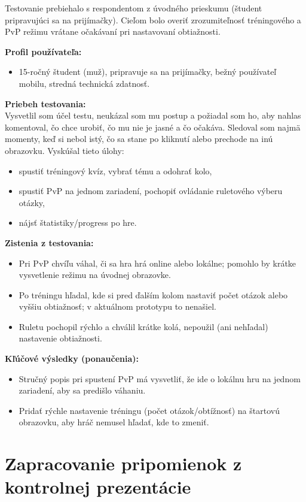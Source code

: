 \documentclass[a4paper,12pt]{article}
\begin{document}
Testovanie prebiehalo s respondentom z úvodného prieskumu (študent pripravujúci sa na prijímačky). Cieľom bolo overiť zrozumiteľnosť tréningového a PvP režimu vrátane očakávaní pri nastavovaní obtiažnosti.

\textbf{Profil používateľa:}
\begin{itemize}
	\item 15-ročný študent (muž), pripravuje sa na prijímačky, bežný používateľ mobilu, stredná technická zdatnosť.
\end{itemize}

\textbf{Priebeh testovania:}
\\
Vysvetlil som účel testu, neukázal som mu postup a požiadal som ho, aby nahlas komentoval, čo chce urobiť, čo mu nie je jasné a čo očakáva. Sledoval som najmä momenty, keď si nebol istý, čo sa stane po kliknutí alebo prechode na inú obrazovku. Vyskúšal tieto úlohy:
\begin{itemize}
	\item spustiť tréningový kvíz, vybrať tému a odohrať kolo,
	\item spustiť PvP na jednom zariadení, pochopiť ovládanie ruletového výberu otázky,
	\item nájsť štatistiky/progress po hre.
\end{itemize}

\textbf{Zistenia z testovania:}
\begin{itemize}
	\item Pri PvP chvíľu váhal, či sa hra hrá online alebo lokálne; pomohlo by krátke vysvetlenie režimu na úvodnej obrazovke.
	\item Po tréningu hľadal, kde si pred ďalším kolom nastaviť počet otázok alebo vyššiu obtiažnosť; v aktuálnom prototypu to nenašiel.
	\item Ruletu pochopil rýchlo a chválil krátke kolá, nepoužil (ani nehľadal) nastavenie obtiažnosti.
\end{itemize}

\textbf{Kľúčové výsledky (ponaučenia):}
\begin{itemize}
	\item Stručný popis pri spustení PvP má vysvetliť, že ide o lokálnu hru na jednom zariadení, aby sa predišlo váhaniu.
	\item Pridať rýchle nastavenie tréningu (počet otázok/obtížnosť) na štartovú obrazovku, aby hráč nemusel hľadať, kde to zmeniť.
\end{itemize}

\section{Zapracovanie pripomienok z kontrolnej prezentácie}
\end{document}
